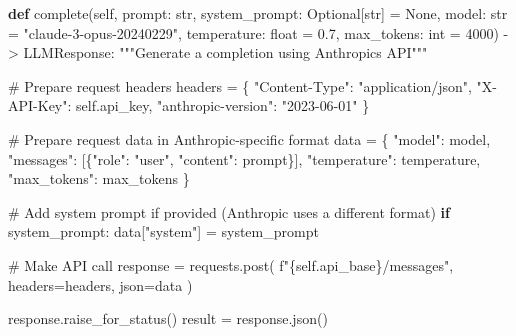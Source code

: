 \documentclass[
  11pt,
  letterpaper,
]{book}
\newenvironment{Shaded}{\begin{snugshade}}{\end{snugshade}}
\newcommand{\BuiltInTok}[1]{\textcolor[rgb]{0.00,0.23,0.31}{#1}}
\newcommand{\CommentTok}[1]{\textcolor[rgb]{0.37,0.37,0.37}{#1}}
\newcommand{\ControlFlowTok}[1]{\textcolor[rgb]{0.00,0.23,0.31}{\textbf{#1}}}
\newcommand{\DecValTok}[1]{\textcolor[rgb]{0.68,0.00,0.00}{#1}}
\newcommand{\FloatTok}[1]{\textcolor[rgb]{0.68,0.00,0.00}{#1}}
\newcommand{\KeywordTok}[1]{\textcolor[rgb]{0.00,0.23,0.31}{\textbf{#1}}}
\newcommand{\NormalTok}[1]{\textcolor[rgb]{0.00,0.23,0.31}{#1}}
\newcommand{\OperatorTok}[1]{\textcolor[rgb]{0.37,0.37,0.37}{#1}}
\newcommand{\SpecialCharTok}[1]{\textcolor[rgb]{0.37,0.37,0.37}{#1}}
\newcommand{\SpecialStringTok}[1]{\textcolor[rgb]{0.13,0.47,0.30}{#1}}
\newcommand{\StringTok}[1]{\textcolor[rgb]{0.13,0.47,0.30}{#1}}
\newcommand{\VariableTok}[1]{\textcolor[rgb]{0.07,0.07,0.07}{#1}}
\begin{document}
\begin{Shaded}
\begin{Highlighting}[]
    \KeywordTok{def}\NormalTok{ complete(}\VariableTok{self}\NormalTok{,}
\NormalTok{                prompt: }\BuiltInTok{str}\NormalTok{,}
\NormalTok{                system\_prompt: Optional[}\BuiltInTok{str}\NormalTok{] }\OperatorTok{=} \VariableTok{None}\NormalTok{,}
\NormalTok{                model: }\BuiltInTok{str} \OperatorTok{=} \StringTok{"claude{-}3{-}opus{-}20240229"}\NormalTok{,}
\NormalTok{                temperature: }\BuiltInTok{float} \OperatorTok{=} \FloatTok{0.7}\NormalTok{,}
\NormalTok{                max\_tokens: }\BuiltInTok{int} \OperatorTok{=} \DecValTok{4000}\NormalTok{) }\OperatorTok{{-}\textgreater{}}\NormalTok{ LLMResponse:}
        \CommentTok{"""Generate a completion using Anthropic\textquotesingle{}s API"""}

        \CommentTok{\# Prepare request headers}
\NormalTok{        headers }\OperatorTok{=}\NormalTok{ \{}
            \StringTok{"Content{-}Type"}\NormalTok{: }\StringTok{"application/json"}\NormalTok{,}
            \StringTok{"X{-}API{-}Key"}\NormalTok{: }\VariableTok{self}\NormalTok{.api\_key,}
            \StringTok{"anthropic{-}version"}\NormalTok{: }\StringTok{"2023{-}06{-}01"}
\NormalTok{        \}}

        \CommentTok{\# Prepare request data in Anthropic{-}specific format}
\NormalTok{        data }\OperatorTok{=}\NormalTok{ \{}
            \StringTok{"model"}\NormalTok{: model,}
            \StringTok{"messages"}\NormalTok{: [\{}\StringTok{"role"}\NormalTok{: }\StringTok{"user"}\NormalTok{, }\StringTok{"content"}\NormalTok{: prompt\}],}
            \StringTok{"temperature"}\NormalTok{: temperature,}
            \StringTok{"max\_tokens"}\NormalTok{: max\_tokens}
\NormalTok{        \}}

        \CommentTok{\# Add system prompt if provided (Anthropic uses a different format)}
        \ControlFlowTok{if}\NormalTok{ system\_prompt:}
\NormalTok{            data[}\StringTok{"system"}\NormalTok{] }\OperatorTok{=}\NormalTok{ system\_prompt}

        \CommentTok{\# Make API call}
\NormalTok{        response }\OperatorTok{=}\NormalTok{ requests.post(}
            \SpecialStringTok{f"}\SpecialCharTok{\{}\VariableTok{self}\SpecialCharTok{.}\NormalTok{api\_base}\SpecialCharTok{\}}\SpecialStringTok{/messages"}\NormalTok{,}
\NormalTok{            headers}\OperatorTok{=}\NormalTok{headers,}
\NormalTok{            json}\OperatorTok{=}\NormalTok{data}
\NormalTok{        )}

\NormalTok{        response.raise\_for\_status()}
\NormalTok{        result }\OperatorTok{=}\NormalTok{ response.json()}


\end{Highlighting}
\end{Shaded}
\end{document}
